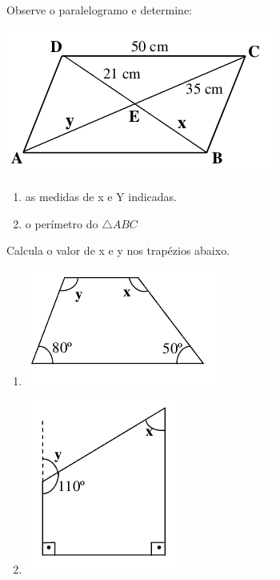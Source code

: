 				\item Observe o paralelogramo e determine:
				\begin{center}
				\includegraphics[scale=0.7]{figuras/fig37}
				\end{center}
				\begin{multicols}{2}
				\begin{enumerate}
					\item as medidas de x e Y indicadas.
					\item o perímetro do $\bigtriangleup ABC$
				\end{enumerate}
				\end{multicols}
				
				\item Calcula o valor de x e y nos trapézios abaixo.
				\begin{multicols}{2}
				\begin{enumerate}
					\item \includegraphics[scale=0.7]{figuras/fig38}
					\item \includegraphics[scale=0.7]{figuras/fig39}
				\end{enumerate}
				\end{multicols}
				
